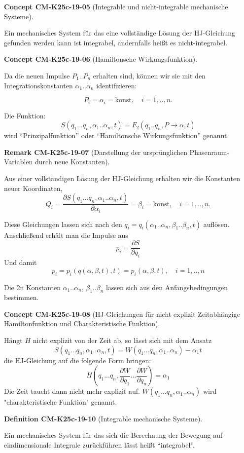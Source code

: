 \documentclass[10pt, letterpaper]{article}
\newcommand{\CustomHeading}[3]{%
  \par\medskip\noindent%
  \textbf{#1 #2} \textnormal{(#3)}.\enskip%
}
\newenvironment{DEF}[2]{\CustomHeading{Definition}{#1}{#2}}{}
\newenvironment{REM}[2]{\CustomHeading{Remark}{#1}{#2}}{}
\newenvironment{CONC}[2]{\CustomHeading{Concept}{#1}{#2}}{}
\begin{document}
\begin{CONC}{CM-K25c-19-05}{Integrable und nicht-integrable mechanische Systeme}
Ein mechanisches System für das eine vollständige Lösung der HJ-Gleichung gefunden werden kann ist integrabel, andernfalls heißt es nicht-integrabel.
\end{CONC}

\begin{CONC}{CM-K25c-19-06}{Hamiltonsche Wirkungsfunktion}
Da die neuen Impulse $P_1..P_n$ erhalten sind, können wir sie mit den Integrationskonstanten $\alpha_1..\alpha_n$ identifizieren:

\[P_i = \alpha_i = \text{konst}, \quad i=1,..,n.\]

Die Funktion:
\[S(q_1...q_n,\alpha_1..\alpha_n,t) = F_2(q_1..q_n,P\rightarrow\alpha,t)\]
wird ``Prinzipalfunktion'' oder ``Hamiltonsche Wirkungsfunktion'' genannt.
\end{CONC}

\begin{REM}{CM-K25c-19-07}{Darstellung der ursprünglichen Phasenraum-Variablen durch neue Konstanten}
Aus einer vollständigen Lösung der HJ-Gleichung erhalten wir die Konstanten neuer Koordinaten,
\[Q_i = \frac{\partial S(q_1...q_n,\alpha_1..\alpha_n,t)}{\partial \alpha_i} = \beta_i = \text{konst}, \quad i=1,..,n.\]

Diese Gleichungen lassen sich nach den $q_i=q_i(\alpha_1..\alpha_n,\beta_1..\beta_n,t)$ auflösen. Anschließend erhält man die Impulse aus
\[p_i = \frac{\partial S}{\partial q_i}\]
Und damit
\[p_i = p_i(q(\alpha,\beta,t),t) = p_i(\alpha,\beta,t), \quad i=1,..,n\]

Die 2n Konstanten $\alpha_1..\alpha_n$, $\beta_1..\beta_n$ lassen sich aus den Anfangsbedingungen bestimmen.
\end{REM}

\begin{CONC}{CM-K25c-19-08}{HJ-Gleichungen für nicht explizit Zeitabhängige Hamiltonfunktion und Charakteristische Funktion}
Hängt $H$ nicht explizit von der Zeit ab, so lässt sich mit dem Ansatz
\[
S(q_1...q_n,\alpha_1..\alpha_n,t) = W(q_1...q_n,\alpha_1..\alpha_n) - \alpha_1t
\]
die HJ-Gleichung auf die folgende Form bringen:
\[
H\left(q_1...q_n,\frac{\partial W}{\partial q_1}...\frac{\partial W}{\partial q_n}\right) = \alpha_1
\]
Die Zeit taucht dann nicht mehr explizit auf. $W(q_1...q_n,\alpha_1..\alpha_n)$ wird "charakteristische Funktion" genannt.
\end{CONC}

\begin{DEF}{CM-K25c-19-10}{Integrable mechanische Systeme}
Ein mechanisches System für das sich die Berechnung der Bewegung auf eindimensionale Integrale zurückführen lässt heißt ``integrabel''.
\end{DEF}
\end{document}
